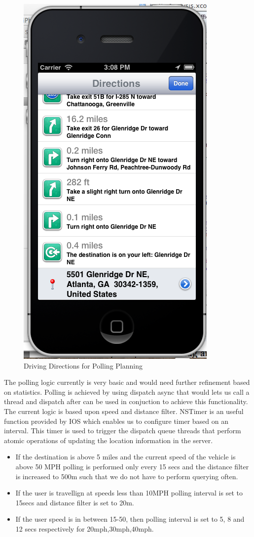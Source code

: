 \documentclass[10pt]{sigplan-proc-varsize}
\begin{document}
\begin{figure}[h!]
  \caption{Driving Directions for Polling Planning}
  \centering
    \includegraphics[scale=0.4]{RoutePrep}
\end{figure}

The polling logic currently is very basic and would need further refinement based on statistics. Polling is achieved by using dispatch async that would lets us call a thread and dispatch after can be used in conjuction to achieve this functionality. The current logic is based upon speed and distance filter. NSTimer is an useful function provided by IOS which enables us to configure timer based on an interval. This timer is used to trigger the dispatch queue threads that perform atomic operations of updating the location information in the server.

\begin{itemize}
\item If the destination is above 5 miles and the current speed of the vehicle is above 50 MPH polling is performed only every 15 secs and the distance filter is increased to 500m such that we do not have to perform querying often.
\item If the user is travellign at speeds less than 10MPH polling interval is set to 15secs and distance filter is set to 20m.
\item If the user speed is in between 15-50, then polling interval is set to 5, 8 and 12 secs respectively for 20mph,30mph,40mph.
\end{itemize}
\end{document}

